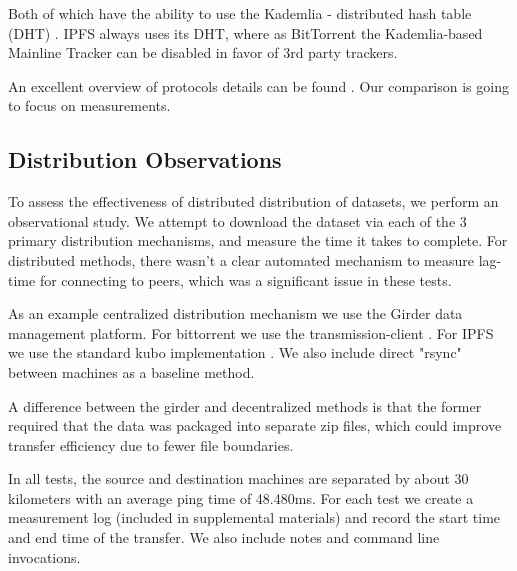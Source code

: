 \documentclass[10pt,twocolumn,letterpaper]{article}
\begin{document}
Both of which have the ability to use the Kademlia - distributed hash table (DHT) \cite{maymounkov_kademlia_2002}.
IPFS always uses its DHT, where as BitTorrent the Kademlia-based Mainline
Tracker can be disabled in favor of 3rd party trackers.

An excellent overview of protocols details can be found \cite{zebedee_comparing_2023}.
Our comparison is going to focus on measurements.




\subsection{Distribution Observations}

To assess the effectiveness of distributed distribution of datasets, we perform
an observational study. We attempt to download the dataset via each of the 3
primary distribution mechanisms, and measure the time it takes to complete.
For distributed methods, there wasn't a clear automated mechanism to measure
lag-time for connecting to peers, which was a significant issue in these tests.

As an example centralized distribution mechanism we use the Girder
\cite{girder_2024} data management platform.
For bittorrent we use the transmission-client \cite{transmission_2024}.
For IPFS we use the standard kubo implementation \cite{girder_2024}.
We also include direct "rsync" \cite{rsyncprojectrsync_2024} between machines as a baseline method.

A difference between the girder and decentralized methods is that the former
required that the data was packaged into separate zip files, which could
improve transfer efficiency due to fewer file boundaries.

In all tests, the source and destination machines are separated by about 30
kilometers with an average ping time of 48.480ms. For each test we create a
measurement log (included in supplemental materials) and record the start
time and end time of the transfer. We also include notes and command line
invocations.
\end{document}
